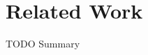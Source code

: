 \documentclass[11pt,a4paper]{article}
\begin{document}
\newpage
\section{Related Work}
\label{sec:related_work}

TODO Summary
\end{document}
